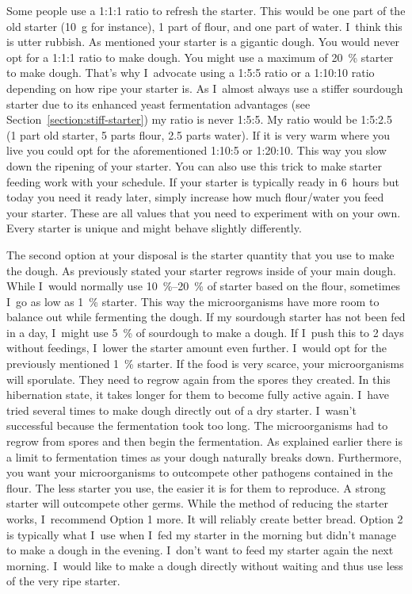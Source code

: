 Some people use a 1:1:1 ratio to refresh the starter. This would
be one part of the old starter (\qty{10}{\gram} for instance), 1 part of flour,
and one part of water. I~think this is utter rubbish. As mentioned
your starter is a gigantic dough. You would never opt for a 1:1:1 ratio to
make dough. You might use a maximum of \qty{20}{\percent} starter to
make dough. That's why I~advocate using a 1:5:5 ratio or a
1:10:10 ratio depending on how ripe your starter is. As I~almost
always use a stiffer sourdough starter due to its enhanced
yeast fermentation advantages (see Section~\ref{section:stiff-starter})
my ratio is never 1:5:5. My ratio would be 1:5:2.5 (1 part old starter,
5 parts flour, 2.5 parts water). If it is very warm where you live
you could opt for the aforementioned 1:10:5 or 1:20:10. This
way you slow down the ripening of your starter. You can also use this
trick to make starter feeding work with your schedule.
If your starter is typically ready in 6~hours but today you need it
ready later, simply increase how much flour/water you feed your starter.
These are all values that you need to experiment with on your own.
Every starter is unique and might behave slightly differently.

The second option at your disposal is the starter quantity that
you use to make the dough. As previously stated your starter
regrows inside of your main dough. While I~would normally use
\qtyrange{10}{20}{\percent} of starter based on the flour, sometimes I~go
as low as \qty{1}{\percent} starter. This way the microorganisms have
more room to balance out while fermenting the dough. If my sourdough
starter has not been fed in a day, I~might use \qty{5}{\percent} of sourdough
to make a dough. If I~push this to 2 days without feedings,
I~lower the starter amount even further. I~would opt for the
previously mentioned \qty{1}{\percent} starter. If the food is very scarce,
your microorganisms will sporulate. They need to regrow again
from the spores they created. In this hibernation state, it takes
longer for them to become fully active again. I~have tried
several times to make dough directly out of a dry starter.
I~wasn't successful because the fermentation took too long.
The microorganisms had to regrow from spores and then begin
the fermentation. As explained earlier there is a limit to
fermentation times as your dough naturally breaks down.
Furthermore, you want your microorganisms to outcompete
other pathogens contained in the flour. The less starter
you use, the easier it is for them to reproduce. A strong
starter will outcompete other germs. While the method of
reducing the starter works, I~recommend Option 1 more.
It will reliably create better bread. Option 2 is typically
what I~use when I~fed my starter in the morning but didn't
manage to make a dough in the evening. I~don't want to feed
my starter again the next morning. I~would like to make a dough
directly without waiting and thus use less of the very ripe starter.

